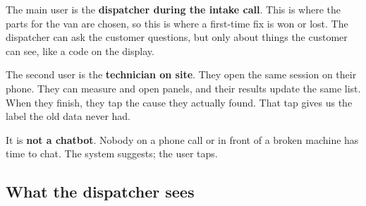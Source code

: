 \documentclass[11pt,a4paper]{article}
\begin{document}
The main user is the \textbf{dispatcher during the intake call}. This is where the parts for the van are chosen, so this is where a first-time fix is won or lost. The dispatcher can ask the customer questions, but only about things the customer can see, like a code on the display.

The second user is the \textbf{technician on site}. They open the same session on their phone. They can measure and open panels, and their results update the same list. When they finish, they tap the cause they actually found. That tap gives us the label the old data never had.

It is \textbf{not a chatbot}. Nobody on a phone call or in front of a broken machine has time to chat. The system suggests; the user taps.

\subsection{What the dispatcher sees}

\newcommand{\causerow}[5]{%
  \fill[#5, rounded corners=1pt] (0.45,#1-0.14) rectangle ++({#2*0.105},0.28);
  \node[anchor=east] at (5.55,#1) {#2\%};
  \node[anchor=west] at (5.75,#1) {#3};
  \node[anchor=west, font=\ttfamily\footnotesize] at (11.6,#1) {#4};}
\newcommand{\chip}[2]{\node[draw=accent!60, fill=accent!6, rounded corners=6pt, inner xsep=7pt, inner ysep=3.5pt, anchor=west] (#1) {#2};}
\end{document}
